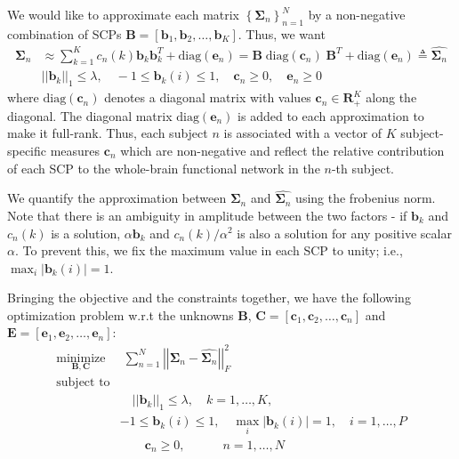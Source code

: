 \documentclass[12pt]{article}
\newcommand{\bB}{\mathbf{B}}
\newcommand{\bb}{\mathbf{b}}
\newcommand{\bC}{\mathbf{C}}
\newcommand{\bc}{\mathbf{c}}
\newcommand{\be}{\mathbf{e}}
\newcommand{\bE}{\mathbf{E}}
\newcommand{\bSigma}{\mathbf{\Sigma}}
\newcommand{\reals}{\mathbb{\mathbf{R}}}
\begin{document}
We would like to approximate each matrix $\left\lbrace \bSigma_n \right\rbrace_{n=1}^{N}$ by a non-negative combination of SCPs $\bB = [\bb_1, \bb_2, \ldots, \bb_K]$. Thus, we want
\begin{align}\label{eq:dictionary}
	\bSigma_n  &\approx  \sum_{k=1}^{K} c_n(k) \bb_k \bb_k^T + \text{diag}(\be_n)  = \bB \; \text{diag}(\bc_n) \; \bB^T  + \text{diag}(\be_n) \triangleq \hat{\bSigma_n} \nonumber   \\
    & \left| \left| \bb_k \right| \right|_1 \leq \lambda  , \quad -1 \leq \bb_k(i) \leq 1 , \quad \bc_n \geq 0, \quad \be_n \geq 0   
\end{align}
where $\text{diag}(\bc_n)$ denotes a diagonal matrix with values $\bc_n \in \reals^K_{+}$ along the diagonal. The diagonal matrix $\text{diag}(\be_n)$ is added to each approximation to make it full-rank. Thus, each subject $n$ is associated with a vector of $K$ subject-specific measures $\bc_n$ which are non-negative and reflect the relative contribution of each SCP to the whole-brain functional network in the $n$-th subject. 

We quantify the approximation between $\bSigma_n$ and $\hat{\bSigma_n}$ using the frobenius norm. Note that there is an ambiguity in amplitude between the two factors - if $\bb_k$ and $c_n(k)$ is a solution, $\alpha \bb_k$ and $c_n(k)/\alpha^2$ is also a solution for any positive scalar $\alpha$. To prevent this, we fix the maximum value in each SCP to unity; i.e., $\max_i \left| \bb_k(i) \right| =  1$. 

Bringing the objective and the constraints together, we have the following optimization problem w.r.t the unknowns $\bB$, $\bC = \left[ \bc_1, \bc_2, \ldots, \bc_n \right]$ and $\bE = \left[ \be_1, \be_2, \ldots, \be_n \right]$:
\begin{equation}
\label{eq:optProb}
	\begin{aligned}
	\underset{\bB,\bC }{\text{minimize}}
	& \; \sum_{n=1}^{N} \left| \left| \bSigma_n - \hat{\bSigma_n} \right| \right|_{F} ^{2} \\
   \text{subject to} \\
	& \quad \left| \left| \bb_k \right| \right|_1 \leq \lambda, \quad k = 1, \ldots, K,\\
	& -1 \leq \bb_k(i) \leq 1 , \quad \max_i \left| \bb_k(i) \right|  =  1,  \quad i = 1, \ldots, P\\
	&  \qquad \bc_n \geq 0 , \quad \qquad n = 1, \ldots, N \\
	\end{aligned}
\end{equation}
\end{document}
